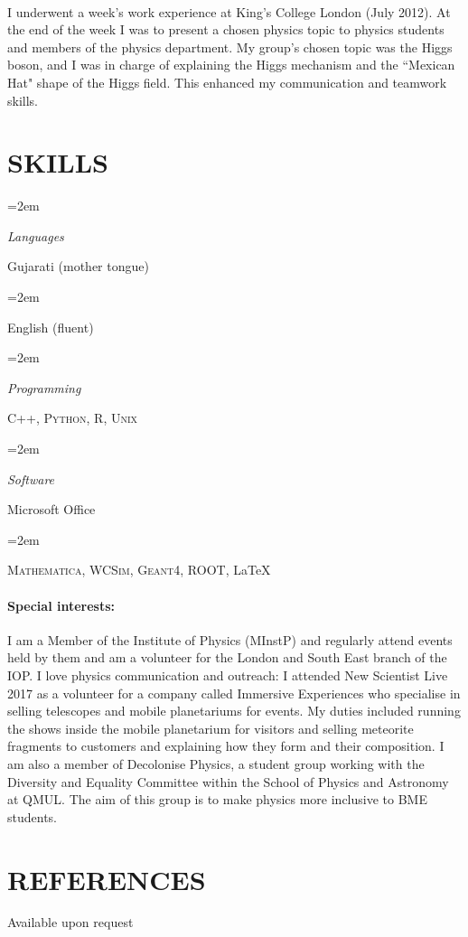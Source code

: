 \documentclass[paper=a4,fontsize=11pt]{scrartcl}	 			%
\newlength{\spacebox}
\newcommand{\NewPart}[1]{\section*{\uppercase{#1}}}
\newcommand{\PersonalEntry}[2]{
		\noindent\hangindent=2em\hangafter=0 		%
		\parbox{\spacebox}{						%
		\textit{#1}}								%
		\hspace{1.5em} #2 \par}					%
\newcommand{\SkillsEntry}[2]{						%
		\noindent\hangindent=2em\hangafter=0 		%
		\parbox{\spacebox}{						%
		\textit{#1}}								%
		\hspace{1.5em} #2 \par}					%
\begin{document}
\paragraph{}
I underwent a week's work experience at King's College London (July 2012). At the end of the week I was to present a chosen physics topic to physics students and members of the physics department. My group's chosen topic was the Higgs boson, and I was in charge of explaining the Higgs mechanism and the ``Mexican Hat" shape of the Higgs field. This enhanced my communication and teamwork skills.

\NewPart{Skills}{}

\SkillsEntry{Languages}{Gujarati (mother tongue)}
\SkillsEntry{}{English (fluent)}
\SkillsEntry{Programming}{\textsc{C++}, \textsc{Python}, \textsc{R}, \textsc{Unix}}
\SkillsEntry{Software}{Microsoft Office}
\SkillsEntry{}{\textsc{Mathematica}, \textsc{WCSim}, \textsc{Geant4}, \textsc{ROOT}, \LaTeX}

\paragraph{Special interests:}
I am a Member of the Institute of Physics (MInstP) and regularly attend events held by them and am a volunteer for the London and South East branch of the IOP.
\newline
I love physics communication and outreach: I attended New Scientist Live 2017 as a volunteer for a company called Immersive Experiences who specialise in selling telescopes and mobile planetariums for events. My duties included running the shows inside the mobile planetarium for visitors and selling meteorite fragments to customers and explaining how they form and their composition.
\newline
I am also a member of Decolonise Physics, a student group working with the Diversity and Equality Committee within the School of Physics and Astronomy at QMUL. The aim of this group is to make physics more inclusive to BME students.





\NewPart{References}{}
Available upon request
\end{document}
